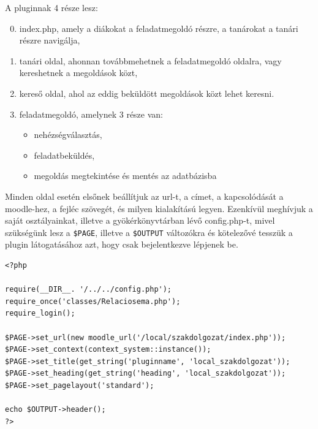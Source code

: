 A pluginnak 4 része lesz:
\begin{enumerate}\setcounter{enumi}{-1}
    \item index.php, amely a diákokat a feladatmegoldó részre, a tanárokat a tanári részre navigálja,
    \item tanári oldal, ahonnan továbbmehetnek a feladatmegoldó oldalra, vagy kereshetnek a megoldások közt,
    \item kereső oldal, ahol az eddig beküldött megoldások közt lehet keresni.
    \item feladatmegoldó, amelynek 3 része van:
    \begin{itemize}
        \item nehézségválasztás,
        \item feladatbeküldés,
        \item megoldás megtekintése és mentés az adatbázisba
    \end{itemize}
\end{enumerate}

Minden oldal esetén elsőnek beállítjuk az url-t, a címet, a kapcsolódását a moodle-hez, a fejléc szövegét, és milyen kialakítású legyen.
Ezenkívül meghívjuk a saját osztályainkat, illetve a gyökérkönyvtárban lévő config.php-t, mivel szükségünk lesz a \texttt{\$PAGE}, illetve a \texttt{\$OUTPUT} változókra és kötelezővé tesszük a plugin látogatásához azt, hogy csak bejelentkezve lépjenek be.
\begin{lstlisting}
<?php

require(__DIR__. '/../../config.php');
require_once('classes/Relaciosema.php');
require_login();

$PAGE->set_url(new moodle_url('/local/szakdolgozat/index.php'));
$PAGE->set_context(context_system::instance());
$PAGE->set_title(get_string('pluginname', 'local_szakdolgozat'));
$PAGE->set_heading(get_string('heading', 'local_szakdolgozat'));
$PAGE->set_pagelayout('standard');

echo $OUTPUT->header();
?>
\end{lstlisting}

